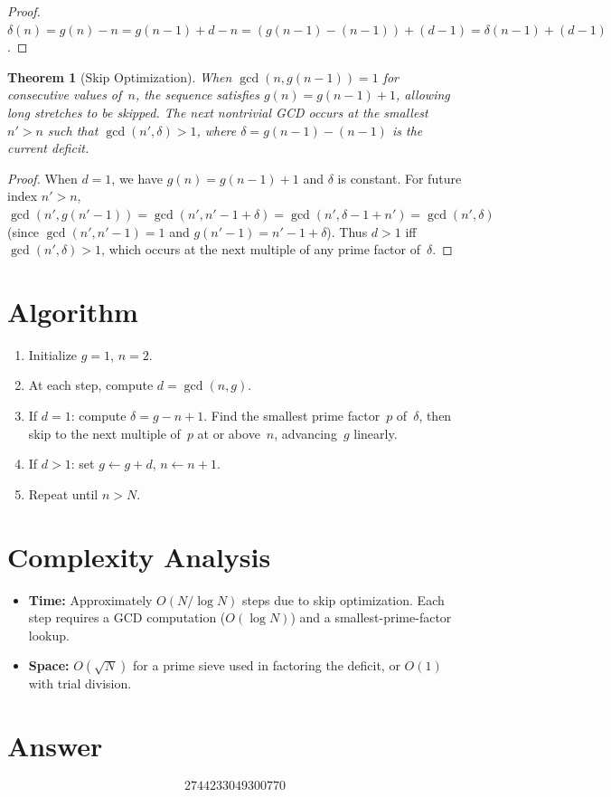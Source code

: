 \documentclass[12pt]{article}
\newtheorem{theorem}{Theorem}
\begin{document}
\begin{proof}
$\delta(n) = g(n) - n = g(n-1) + d - n = (g(n-1) - (n-1)) + (d - 1) = \delta(n-1) + (d - 1)$.
\end{proof}

\begin{theorem}[Skip Optimization]
When $\gcd(n, g(n-1)) = 1$ for consecutive values of~$n$, the sequence satisfies $g(n) = g(n-1) + 1$, allowing long stretches to be skipped. The next nontrivial GCD occurs at the smallest $n' > n$ such that $\gcd(n', \delta) > 1$, where $\delta = g(n-1) - (n-1)$ is the current deficit.
\end{theorem}

\begin{proof}
When $d = 1$, we have $g(n) = g(n-1) + 1$ and $\delta$ is constant. For future index $n' > n$, $\gcd(n', g(n'-1)) = \gcd(n', n' - 1 + \delta) = \gcd(n', \delta - 1 + n') = \gcd(n', \delta)$ (since $\gcd(n', n'-1) = 1$ and $g(n'-1) = n' - 1 + \delta$). Thus $d > 1$ iff $\gcd(n', \delta) > 1$, which occurs at the next multiple of any prime factor of~$\delta$.
\end{proof}

\section{Algorithm}

\begin{enumerate}
\item Initialize $g = 1$, $n = 2$.
\item At each step, compute $d = \gcd(n, g)$.
\item If $d = 1$: compute $\delta = g - n + 1$. Find the smallest prime factor~$p$ of~$\delta$, then skip to the next multiple of~$p$ at or above~$n$, advancing~$g$ linearly.
\item If $d > 1$: set $g \leftarrow g + d$, $n \leftarrow n + 1$.
\item Repeat until $n > N$.
\end{enumerate}

\section{Complexity Analysis}

\begin{itemize}
\item \textbf{Time:} Approximately $O(N / \log N)$ steps due to skip optimization. Each step requires a GCD computation ($O(\log N)$) and a smallest-prime-factor lookup.
\item \textbf{Space:} $O(\sqrt{N})$ for a prime sieve used in factoring the deficit, or $O(1)$ with trial division.
\end{itemize}

\section{Answer}

\[
\boxed{2744233049300770}
\]
\end{document}
